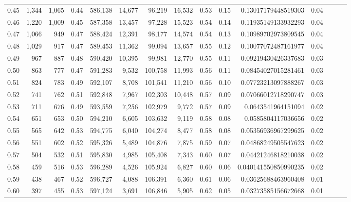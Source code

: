 \begin{tabular}{rrrrrrrrrrrrrrr}
0.45 &   1,344 &  1,065 &  0.44 &  586,138 &   14,677 &   96,219 &   16,532 &  0.53 &  0.15 &     0.13017179448519303 &      0.04 \\
0.46 &   1,220 &  1,009 &  0.45 &  587,358 &   13,457 &   97,228 &   15,523 &  0.54 &  0.14 &     0.11935149133932293 &      0.04 \\
0.47 &   1,066 &    949 &  0.47 &  588,424 &   12,391 &   98,177 &   14,574 &  0.54 &  0.13 &     0.10989702973809545 &      0.04 \\
0.48 &   1,029 &    917 &  0.47 &  589,453 &   11,362 &   99,094 &   13,657 &  0.55 &  0.12 &     0.10077072487161977 &      0.04 \\
0.49 &     967 &    887 &  0.48 &  590,420 &   10,395 &   99,981 &   12,770 &  0.55 &  0.11 &     0.09219430426337683 &      0.03 \\
0.50 &     863 &    777 &  0.47 &  591,283 &    9,532 &  100,758 &   11,993 &  0.56 &  0.11 &     0.08454027015281461 &      0.03 \\
0.51 &     824 &    783 &  0.49 &  592,107 &    8,708 &  101,541 &   11,210 &  0.56 &  0.10 &     0.07723213097888267 &      0.03 \\
0.52 &     741 &    762 &  0.51 &  592,848 &    7,967 &  102,303 &   10,448 &  0.57 &  0.09 &     0.07066012718290747 &      0.03 \\
0.53 &     711 &    676 &  0.49 &  593,559 &    7,256 &  102,979 &    9,772 &  0.57 &  0.09 &      0.0643541964151094 &      0.02 \\
0.54 &     651 &    653 &  0.50 &  594,210 &    6,605 &  103,632 &    9,119 &  0.58 &  0.08 &      0.0585804117036656 &      0.02 \\
0.55 &     565 &    642 &  0.53 &  594,775 &    6,040 &  104,274 &    8,477 &  0.58 &  0.08 &     0.05356936967299625 &      0.02 \\
0.56 &     551 &    602 &  0.52 &  595,326 &    5,489 &  104,876 &    7,875 &  0.59 &  0.07 &     0.04868249505547623 &      0.02 \\
0.57 &     504 &    532 &  0.51 &  595,830 &    4,985 &  105,408 &    7,343 &  0.60 &  0.07 &     0.04421246818210038 &      0.02 \\
0.58 &     459 &    516 &  0.53 &  596,289 &    4,526 &  105,924 &    6,827 &  0.60 &  0.06 &    0.040141550850990235 &      0.02 \\
0.59 &     438 &    467 &  0.52 &  596,727 &    4,088 &  106,391 &    6,360 &  0.61 &  0.06 &     0.03625688463960408 &      0.01 \\
0.60 &     397 &    455 &  0.53 &  597,124 &    3,691 &  106,846 &    5,905 &  0.62 &  0.05 &     0.03273585156672668 &      0.01 \\

\end{tabular}

